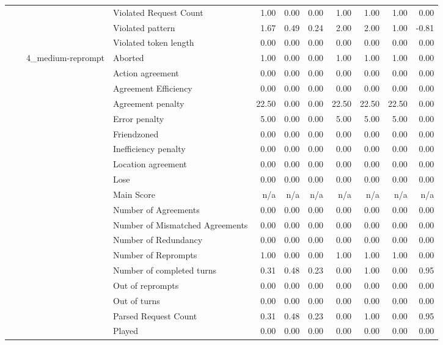\begin{tabular}{llllrrrrrrr}
 &  &  & Violated Request Count & 1.00 & 0.00 & 0.00 & 1.00 & 1.00 & 1.00 & 0.00 \\
 &  &  & Violated pattern & 1.67 & 0.49 & 0.24 & 2.00 & 2.00 & 1.00 & -0.81 \\
 &  &  & Violated token length & 0.00 & 0.00 & 0.00 & 0.00 & 0.00 & 0.00 & 0.00 \\
\cline{3-11}
 &  & \multirow[t]{27}{*}{4_medium-reprompt} & Aborted & 1.00 & 0.00 & 0.00 & 1.00 & 1.00 & 1.00 & 0.00 \\
 &  &  & Action agreement & 0.00 & 0.00 & 0.00 & 0.00 & 0.00 & 0.00 & 0.00 \\
 &  &  & Agreement Efficiency & 0.00 & 0.00 & 0.00 & 0.00 & 0.00 & 0.00 & 0.00 \\
 &  &  & Agreement penalty & 22.50 & 0.00 & 0.00 & 22.50 & 22.50 & 22.50 & 0.00 \\
 &  &  & Error penalty & 5.00 & 0.00 & 0.00 & 5.00 & 5.00 & 5.00 & 0.00 \\
 &  &  & Friendzoned & 0.00 & 0.00 & 0.00 & 0.00 & 0.00 & 0.00 & 0.00 \\
 &  &  & Inefficiency penalty & 0.00 & 0.00 & 0.00 & 0.00 & 0.00 & 0.00 & 0.00 \\
 &  &  & Location agreement & 0.00 & 0.00 & 0.00 & 0.00 & 0.00 & 0.00 & 0.00 \\
 &  &  & Lose & 0.00 & 0.00 & 0.00 & 0.00 & 0.00 & 0.00 & 0.00 \\
 &  &  & Main Score & n/a & n/a & n/a & n/a & n/a & n/a & n/a \\
 &  &  & Number of Agreements & 0.00 & 0.00 & 0.00 & 0.00 & 0.00 & 0.00 & 0.00 \\
 &  &  & Number of Mismatched Agreements & 0.00 & 0.00 & 0.00 & 0.00 & 0.00 & 0.00 & 0.00 \\
 &  &  & Number of Redundancy & 0.00 & 0.00 & 0.00 & 0.00 & 0.00 & 0.00 & 0.00 \\
 &  &  & Number of Reprompts & 1.00 & 0.00 & 0.00 & 1.00 & 1.00 & 1.00 & 0.00 \\
 &  &  & Number of completed turns & 0.31 & 0.48 & 0.23 & 0.00 & 1.00 & 0.00 & 0.95 \\
 &  &  & Out of reprompts & 0.00 & 0.00 & 0.00 & 0.00 & 0.00 & 0.00 & 0.00 \\
 &  &  & Out of turns & 0.00 & 0.00 & 0.00 & 0.00 & 0.00 & 0.00 & 0.00 \\
 &  &  & Parsed Request Count & 0.31 & 0.48 & 0.23 & 0.00 & 1.00 & 0.00 & 0.95 \\
 &  &  & Played & 0.00 & 0.00 & 0.00 & 0.00 & 0.00 & 0.00 & 0.00 \\

\end{tabular}
